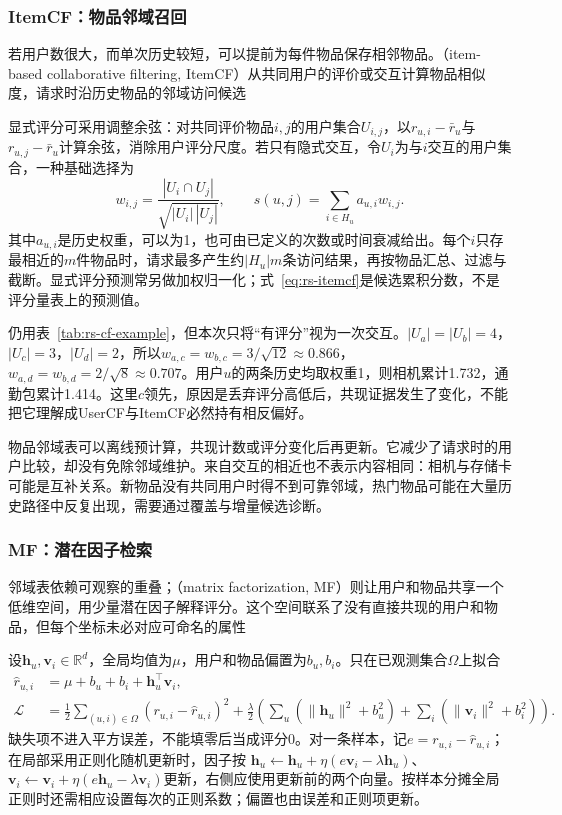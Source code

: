 \subsubsection{ItemCF：物品邻域召回}
\label{sec:rs-itemcf}

若用户数很大，而单次历史较短，可以提前为每件物品保存相邻物品。（item-based collaborative filtering, ItemCF）从共同用户的评价或交互计算物品相似度，请求时沿历史物品的邻域访问候选

显式评分可采用调整余弦：对共同评价物品$i,j$的用户集合$U_{i,j}$，以$r_{u,i}-\bar r_u$与$r_{u,j}-\bar r_u$计算余弦，消除用户评分尺度。若只有隐式交互，令$U_i$为与$i$交互的用户集合，一种基础选择为
\begin{equation}
 w_{i,j}=\frac{|U_i\cap U_j|}{\sqrt{|U_i|\,|U_j|}},
 \qquad s(u,j)=\sum_{i\in H_u}a_{u,i}w_{i,j}.
 \label{eq:rs-itemcf}
\end{equation}
其中$a_{u,i}$是历史权重，可以为1，也可由已定义的次数或时间衰减给出。每个$i$只存最相近的$m$件物品时，请求最多产生约$|H_u|m$条访问结果，再按物品汇总、过滤与截断。显式评分预测常另做加权归一化；式~\eqref{eq:rs-itemcf}是候选累积分数，不是评分量表上的预测值。

仍用表~\ref{tab:rs-cf-example}，但本次只将“有评分”视为一次交互。$|U_a|=|U_b|=4$，$|U_c|=3$，$|U_d|=2$，所以$w_{a,c}=w_{b,c}=3/\sqrt{12}\approx0.866$，$w_{a,d}=w_{b,d}=2/\sqrt8\approx0.707$。用户$u$的两条历史均取权重1，则相机累计1.732，通勤包累计1.414。这里$c$领先，原因是丢弃评分高低后，共现证据发生了变化，不能把它理解成UserCF与ItemCF必然持有相反偏好。

物品邻域表可以离线预计算，共现计数或评分变化后再更新。它减少了请求时的用户比较，却没有免除邻域维护。来自交互的相近也不表示内容相同：相机与存储卡可能是互补关系。新物品没有共同用户时得不到可靠邻域，热门物品可能在大量历史路径中反复出现，需要通过覆盖与增量候选诊断。

\subsubsection{MF：潜在因子检索}
\label{sec:rs-mf}

邻域表依赖可观察的重叠；（matrix factorization, MF）则让用户和物品共享一个低维空间，用少量潜在因子解释评分。这个空间联系了没有直接共现的用户和物品，但每个坐标未必对应可命名的属性

设$\bm{h}_u,\bm{v}_i\in\mathbb{R}^d$，全局均值为$\mu$，用户和物品偏置为$b_u,b_i$。只在已观测集合$\Omega$上拟合
\begin{align}
 \widehat r_{u,i}&=\mu+b_u+b_i+\bm{h}_u^\top\bm{v}_i,\\
 \mathcal L&=\frac12\sum_{(u,i)\in\Omega}
  (r_{u,i}-\widehat r_{u,i})^2+
  \frac\lambda2\left(\sum_u(\|\bm h_u\|^2+b_u^2)
  +\sum_i(\|\bm v_i\|^2+b_i^2)\right).
 \label{eq:rs-mf-objective}
\end{align}
缺失项不进入平方误差，不能填零后当成评分0。对一条样本，记$e=r_{u,i}-\widehat r_{u,i}$；在局部采用正则化随机更新时，因子按
$\bm h_u\leftarrow\bm h_u+\eta(e\bm v_i-\lambda\bm h_u)$、
$\bm v_i\leftarrow\bm v_i+\eta(e\bm h_u-\lambda\bm v_i)$更新，右侧应使用更新前的两个向量。按样本分摊全局正则时还需相应设置每次的正则系数；偏置也由误差和正则项更新。

